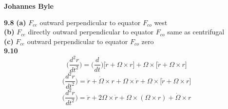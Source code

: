 \documentclass[english]{article}
\begin{document}
\begin{multicols*}{2}
\textbf{Johannes Byle}\\
\newcommand{\Lagr}{\mathcal{L}}

\noindent
\textbf{9.8}
\textbf{(a)} $F_{ce}$ outward perpendicular to equator $F_{co}$ west\\
\textbf{(b)} $F_{ce}$ directly outward perpendicular to equator $F_{co}$ same as centrifugal\\
\textbf{(c)} $F_{ce}$ outward perpendicular to equator $F_{co}$ zero\\

\noindent
\textbf{9.10}
$$\Big(\frac{d^2r}{dt^2}\Big)=\Big(\frac{d}{dt}\Big)\Big[\dot{r}+\Omega\times r\Big]+\Omega\times\Big[\dot{r}+\Omega\times r\Big]$$
$$\Big(\frac{d^2r}{dt^2}\Big)=\ddot{r}+\dot{\Omega}\times r+\Omega\times\dot{r}+\Omega\times\Big[\dot{r}+\Omega\times r\Big]$$
$$\Big(\frac{d^2r}{dt^2}\Big)=\ddot{r}+2\Omega\times\dot{r}+\Omega\times(\Omega\times r)+\dot\Omega\times r$$
\end{multicols*}
\end{document}
